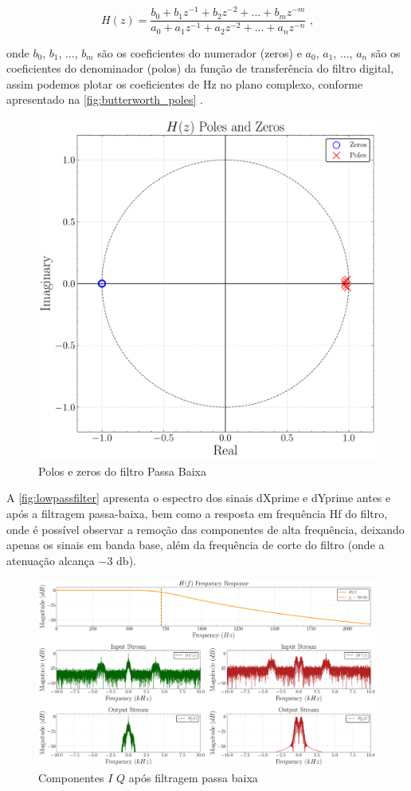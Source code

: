 \begin{equation}
    H(z) = \frac{b_0 + b_1 z^{-1} + b_2 z^{-2} + ... + b_m z^{-m}}{a_0 + a_1 z^{-1} + a_2 z^{-2} + ... + a_n z^{-n}} \text{ ,}
\end{equation}

\noindent onde $b_0$, $b_1$, ..., $b_m$ são os coeficientes do numerador (zeros) e $a_0$, $a_1$, ..., $a_n$ são os coeficientes do denominador (polos) da função de transferência do filtro digital, assim podemos plotar os coeficientes de \gls{Hz} no plano complexo, conforme apresentado na \autoref{fig:butterworth_poles} \cite{10555531840}.

\begin{figure}[H]
    \centering
    \caption{Polos e zeros do filtro Passa Baixa}\label{fig:butterworth_poles}
    \includegraphics[width=0.6\linewidth]{assets/cap2/example_lpf_pz.pdf}
\end{figure}

A \autoref{fig:lowpassfilter} apresenta o espectro dos sinais \gls{dXprime} e \gls{dYprime} antes e após a filtragem passa-baixa, bem como a resposta em frequência \gls{Hf} do filtro, onde é possível observar a remoção das componentes de alta frequência, deixando apenas os sinais em banda base, além da frequência de corte do filtro (onde a atenuação alcança $-3$ \gls{db}).

\begin{figure}[H]
	\centering
	\caption{Componentes $I$ $Q$ após filtragem passa baixa}\label{fig:lowpassfilter}
	\includegraphics[width=\linewidth]{assets/cap2/receiver_lpf_freq.pdf}
\end{figure}

